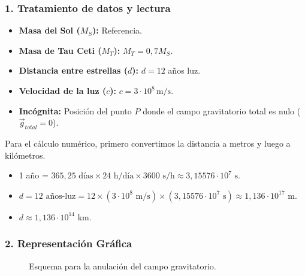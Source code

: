 \subsubsection*{1. Tratamiento de datos y lectura}
\begin{itemize}
    \item \textbf{Masa del Sol ($M_S$):} Referencia.
    \item \textbf{Masa de Tau Ceti ($M_T$):} $M_T = 0,7 M_S$.
    \item \textbf{Distancia entre estrellas ($d$):} $d = 12$ años luz.
    \item \textbf{Velocidad de la luz ($c$):} $c = 3\cdot10^8 \, \text{m/s}$.
    \item \textbf{Incógnita:} Posición del punto $P$ donde el campo gravitatorio total es nulo ($\vec{g}_{total}=0$).
\end{itemize}
Para el cálculo numérico, primero convertimos la distancia a metros y luego a kilómetros.
\begin{itemize}
    \item 1 año = $365,25 \text{ días} \times 24 \text{ h/día} \times 3600 \text{ s/h} \approx 3,15576 \cdot 10^7 \text{ s}$.
    \item $d = 12 \text{ años-luz} = 12 \times (3\cdot10^8 \text{ m/s}) \times (3,15576 \cdot 10^7 \text{ s}) \approx 1,136 \cdot 10^{17} \text{ m}$.
    \item $d \approx 1,136 \cdot 10^{14} \text{ km}$.
\end{itemize}

\subsubsection*{2. Representación Gráfica}
\begin{figure}[H]
    \centering
    \caption{Esquema para la anulación del campo gravitatorio.}
\end{figure}

